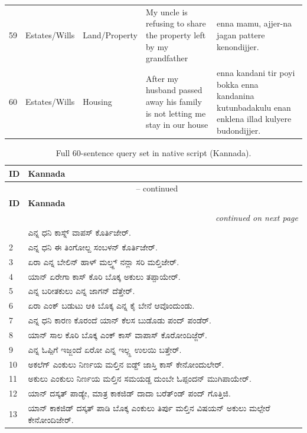 \documentclass[11pt]{article}
\begin{document}
\begin{longtable}{p{} p{} p{} p{} p{}}
59 & Estates/\allowbreak Wills & Land/\allowbreak Property & My uncle is refusing to share the property left by my grandfather & enna mamu, ajjer-na jagan pattere kenondijjer. \\
60 & Estates/\allowbreak Wills & Housing & After my husband passed away his family is not letting me stay in our house & enna kandani tir poyi bokka enna kandanina kutunbadakulu enan enklena illad kulyere budondijjer. \\
\end{longtable}

\setlength{\tabcolsep}{6pt}

\renewcommand{\arraystretch}{1.15}
\begin{longtable}{p{} >{\kannadafont}p{}}
\caption{Full 60-sentence query set in native script (Kannada).}
\label{tab:queries-script} \\
\toprule
\textbf{ID} & \normalfont\textbf{Kannada} \\
\midrule
\endfirsthead
\multicolumn{2}{c}{\tablename\ \thetable{} -- continued} \\
\toprule
\textbf{ID} & \normalfont\textbf{Kannada} \\
\midrule
\endhead
\midrule
\multicolumn{2}{r}{\textit{continued on next page}} \\
\endfoot
\bottomrule
\endlastfoot
1 & ಎನ್ನ ಧನಿ ಕಾಸ್ನ್ ವಾಪಸ್ ಕೊರ್ತಿಜೇರ್. \\
2 & ಎನ್ನ ಧನಿ ಈ ತಿಂಗೋಲ್ದ ಸಂಬಳನ್ ಕೊರ್ತಿಜೇರ್. \\
3 & ಏರಾ ಎನ್ನ ಬೇಲಿನ್ ಹಾಳ್ ಮಲ್ತ್ದ್ ನನ್ಲಾ ಸರಿ ಮಲ್ತಿಜೇರ್. \\
4 & ಯಾನ್ ಏರೇಗಾ ಕಾಸ್ ಕೊರಿ ಬೊಕ್ಕ ಅಕುಲು ತಪ್ಪಾಯೇರ್. \\
5 & ಎನ್ನ ಬರೀತಕುಲು ಎನ್ನ ಜಾಗನ್ ದೆತ್ತೇರ್. \\
6 & ಏರಾ ಎಂಕ್ ಬಡುಟು ಆಕಿ ಬೊಕ್ಕ ಎನ್ನ ಕೈ ಬೇನೆ ಆವೊಂದುಂಡು. \\
7 & ಎನ್ನ ಧನಿ ಕಾರಣ ಕೊರಂದೆ ಯಾನ್ ಕೆಲಸ ಬುಡೊಡು ಪಂದ್ ಪಂಡೆರ್. \\
8 & ಯಾನ್ ಸಾಲ ಕೊರಿ ಬೊಕ್ಕ ಎಂಕ್ ಕಾಸ್ ವಾಪಾಸ್ ಕೊರೋಂದಿಜ್ಜೆರ್. \\
9 & ಎನ್ನ ಓಪ್ಪಿಗೆ ಇಜ್ಜಂದೆ ಏರೋ ಎನ್ನ ಇಲ್ಲ್ದ ಉಲಯಿ ಬತ್ತೇರ್. \\
10 & ಅಕಲೆಗ್ ಎಂಕುಲು ನಿರ್ಣಯ ಮಲ್ತಿನ ಐಡ್ದ್ ಜಾಸ್ತಿ ಕಾಸ್ ಕೇನೋಂದುಲೇರ್. \\
11 & ಅಕುಲು ಎಂಕುಲು ನಿರ್ಣಯ ಮಲ್ತಿನ ಸಮಯಡ್ದ ದುಂಬೇ ಓಪ್ಪಂದನ್ ಮುಗಿಪಾಯೇರ್. \\
12 & ಯಾನ್ ದಸ್ಕತ್ ಪಾಡ್ಯೇ, ಮಾತ್ರ ಕಾಕಜಿಡ್ ದಾದಾ ಬರೆತ್ಂಡ್ ಪಂದ್ ಗೊತ್ತಿಜಿ. \\
13 & ಯಾನ್ ಕಾಕಜಿಡ್ ದಸ್ಕತ್ ಪಾಡಿ ಬೊಕ್ಕ ಎಂಕುಲು ತಿರ್ಪು ಮಲ್ತಿನ ವಿಷಯನ್ ಅಕುಲು ಮಲ್ಪೇರೆ ಕೇನೋಂದಿಜೇರ್. \\

\end{longtable}
\end{document}
